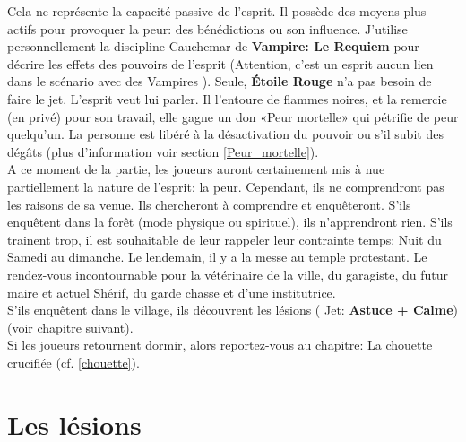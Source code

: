 \documentclass[oneside,12pt]{book}
\newcommand\roll[1]{
( Jet: \textbf{#1})
}
\newcommand{\Lynn}{\textbf{Étoile Rouge} }
\begin{document}
\begin{flushleft}
Cela ne représente la capacité passive de l'esprit. Il possède des moyens plus actifs pour provoquer la peur: des bénédictions ou son influence. J'utilise personnellement la discipline Cauchemar de \textbf{Vampire: Le Requiem} pour décrire les effets des pouvoirs de l'esprit (Attention, c'est un esprit aucun lien dans le scénario avec des Vampires ).
Seule, \Lynn n'a pas besoin de faire le jet. L'esprit veut lui parler. 
Il l'entoure de flammes noires, et la remercie (en privé) pour son travail, elle gagne un don «Peur mortelle»  qui pétrifie de peur quelqu'un. La personne est libéré à la désactivation du pouvoir ou s'il subit des dégâts (plus d'information voir section \ref{Peur_mortelle}).\\
A ce moment de la partie, les joueurs auront certainement mis à nue partiellement la nature de l'esprit: la peur. Cependant, ils ne comprendront pas les raisons de sa venue. Ils chercheront à comprendre et enquêteront. 
S'ils enquêtent dans la forêt (mode physique ou spirituel), ils n'apprendront rien. 
S'ils trainent trop, il est souhaitable de leur rappeler leur contrainte temps: Nuit du Samedi au dimanche. Le lendemain, il y a la messe au temple protestant. 
Le rendez-vous incontournable pour la vétérinaire de la ville, du garagiste, du futur maire et actuel Shérif, du garde chasse et d'une institutrice.\\  
S'ils enquêtent dans le village, ils découvrent les lésions \roll{Astuce + Calme} (voir chapitre suivant). \\
Si les joueurs retournent dormir, alors reportez-vous au chapitre: La chouette crucifiée (cf. \ref{chouette}). 


\section{Les lésions}

\end{flushleft}
\end{document}
